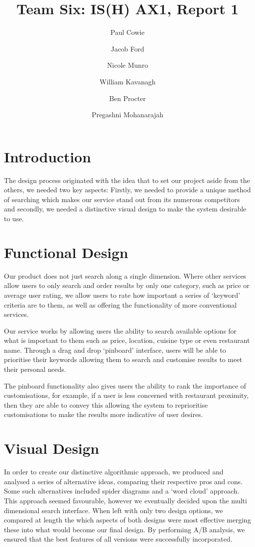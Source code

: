 \documentclass[10pt,a4paper]{article}
\author{Paul Cowie \and Jacob Ford \and Nicole Munro \and William Kavanagh \and Ben Procter \and Pregashni Mohanarajah }
\date{}
\title{Team Six: IS(H) AX1, Report 1}
\begin{document}
\maketitle

\section*{Introduction}
The design process originated with the idea that to set our project aside from the others, we needed two key aspects:
Firstly, we needed to provide a unique method of searching which makes our service stand out from its numerous competitors and secondly, we needed a distinctive visual design to make the system desirable to use.

\section*{Functional Design}
Our product does not just search along a single dimension. Where other services allow users to only search and order results by only one category, such as price or average user rating, we allow users to rate how important a series of ‘keyword’ criteria are to them, as well as offering the functionality of more conventional services.

Our service works by allowing users the ability to search available options for what is important to them such as price, location, cuisine type or even restaurant name. Through a drag and drop ‘pinboard’ interface, users will be able to prioritise their keywords allowing them to search and customise results to meet their personal needs.

The pinboard functionality also gives users the ability to rank the importance of customisations, for example, if a user is less concerned with restaurant proximity, then they are able to convey this allowing the system to reprioritise customisations to make the results more indicative of user desires.

\section*{Visual Design}
In order to create our distinctive algorithmic approach, we produced and analysed a series of alternative ideas, comparing their respective pros and cons. Some such alternatives included spider diagrams and a ‘word cloud’ approach. This approach seemed favourable, however we eventually decided upon the multi dimensional search interface. When left with only two design options, we compared at length the which aspects of both designs were most effective merging these into what would become our final design. By performing A/B analysis, we ensured that the best features of all versions were successfully incorporated.
\end{document}
